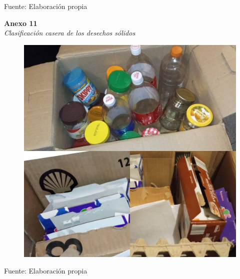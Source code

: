 \setlength{\parindent}{0ex}

Fuente: Elaboración propia

\newpage

\textbf{Anexo 11} \\
\textit{Clasificación casera de los desechos sólidos}

\begin{figure}[!ht]
    \centering
    \includegraphics[width=15cm]{Media/Fotos/Foto final clasificacion.jpeg}
    \label{fig:anexo12}
\end{figure}

\setlength{\parindent}{0ex}

Fuente: Elaboración propia
